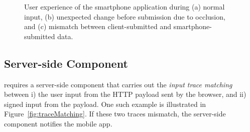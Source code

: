 \begin{figure}[t]
{		\label{fig:userExperience:inputComparison}
	}
	\hfill
	\hfill
	\null
	\caption{
		User experience of the smartphone application during (a) normal input, (b) unexpected change before submission due to occlusion, and (c) mismatch between client-submitted and smartphone-submitted data.
}
	\label{fig:userExperience}
\end{figure}




\subsection{Server-side Component}
\label{sec:systemDesign:webserver}

\sysname requires a server-side component that carries out the \emph{input trace matching} between i) the user input from the HTTP payload sent by the browser, and ii) signed input from the \sysname \tls payload. One such example is illustrated in Figure~\ref{fig:traceMatching}. If these two traces mismatch, the \name server-side component notifies the \name mobile app.


